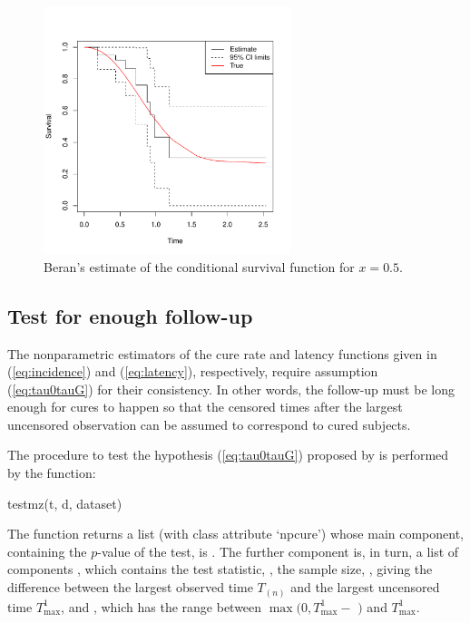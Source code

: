 \begin{figure}[htbp]
  \centering
  \includegraphics[width=7.2cm, height=7.2cm]{Figure-029}
  \caption{Beran's estimate of the conditional survival function for $x=0.5$.}
  \label{fig:beran} 
\end{figure}

\subsection{Test for enough follow-up} \label{sec:MZ_test}

The nonparametric estimators of the cure rate and latency functions given in (\ref{eq:incidence}) and (\ref{eq:latency}), respectively, require assumption (\ref{eq:tau0tauG}) for their consistency. In other words, the follow-up must be long enough for cures to happen so that the censored times after the largest uncensored observation can be assumed to correspond to cured subjects.

The procedure to test the hypothesis (\ref{eq:tau0tauG}) proposed by \cite{Maller1} is performed by the  function:

\begin{example}
testmz(t, d, dataset)
\end{example}

The function returns a list (with class attribute `npcure') whose main component, containing the $p$-value of the test, is . The further component  is, in turn, a list of components , which contains the test statistic, , the sample size, , giving the difference between the largest observed time $T_{(n)}$ and the largest uncensored time $T^1_{\max}$, and , which has the range between $\max (0, T^1_{\max} -$ $)$ and $T^1_{\max}$.

